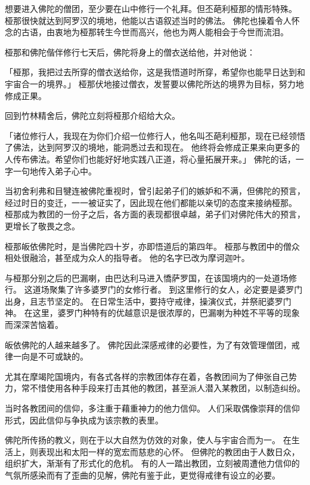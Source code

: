 \documentclass[twoside,openany]{book}
\begin{document}
想要进入佛陀的僧团，至少要在山中修行一个礼拜。但丕葩利\textperiodcentered 桠那的情形特殊。
桠那很快就达到阿罗汉的境地，他能以古语叙述当时的佛法。
佛陀也操着令人怀念的古语，由衷地为桠那转生今世而高兴，他也为两人能相会于今世而流泪。

桠那和佛陀偕伴修行七天后，佛陀将身上的僧衣送给他，并对他说：

「桠那，我把过去所穿的僧衣送给你，这是我悟道时所穿，希望你也能早日达到和宇宙合一的境界。」
桠那伏地接过僧衣，发誓要以佛陀所达的境界为目标，努力地修成正果。

回到竹林精舍后，佛陀立刻将桠那介绍给大众。

「诸位修行人，我现在为你们介绍一位修行人，他名叫丕葩利\textperiodcentered 桠那，现在已经领悟了佛法，达到阿罗汉的境地，能洞悉过去和现在。
他终将会修成正果来向更多的人传布佛法。希望你们也能好好地实践八正道，将心量拓展开来。」
佛陀的话，一字一句地传入弟子心中。

当初舍利弗和目犍连被佛陀重视时，曾引起弟子们的嫉妒和不满，但佛陀的预言，经过时日的变迁，一一被证实了，因此现在他们都能以亲切的态度来接纳桠那。
桠那成为教团的一份子之后，各方面的表现都很卓越，弟子们对佛陀伟大的预言，更增长了敬畏之念。

桠那皈依佛陀时，是当佛陀四十岁，亦即悟道后的第四年。
桠那与教团中的僧众相处很融洽，甚至成为众人的指导者。
他的名字已改为摩诃迦叶。

与桠那分别之后的巴漏喇，由巴达利马进入憍萨罗国，在该国境内的一处道场修行。
这道场聚集了许多婆罗门的女修行者。
到这里修行的女人，必定要是婆罗门出身，且志节坚定的。
在日常生活中，要持守戒律，操演仪式，并祭祀婆罗门神。
在这里，婆罗门种特有的优越意识是很浓厚的，巴漏喇为种姓不平等的现象而深深苦恼着。

皈依佛陀的人越来越多了。
%
%
佛陀因此深感戒律的必要性，为了有效管理僧团，戒律一向是不可或缺的。

尤其在摩竭陀国境内，有各式各样的宗教团体存在着，各教团间为了伸张自己势力，常不惜使用各种手段来打击其他的教团，甚至派人潜入某教团，以制造纠纷。

当时各教团间的信仰，多注重于藉重神力的他力信仰。
人们采取偶像崇拜的信仰形式，因此信仰与争执成为该宗教的表里。

佛陀所传扬的教义，则在于以大自然为仿效的对象，使人与宇宙合而为一。
在生活上，则表现出和太阳一样的宽宏而慈悲的心怀。
但佛陀的教团由于人数日众，组织扩大，渐渐有了形式化的危机。
有的人一踏出教团，立刻被周遭他力信仰的气氛所感染而有了歪曲的见解，佛陀有鉴于此，更觉得戒律有设立的必要。
\end{document}
